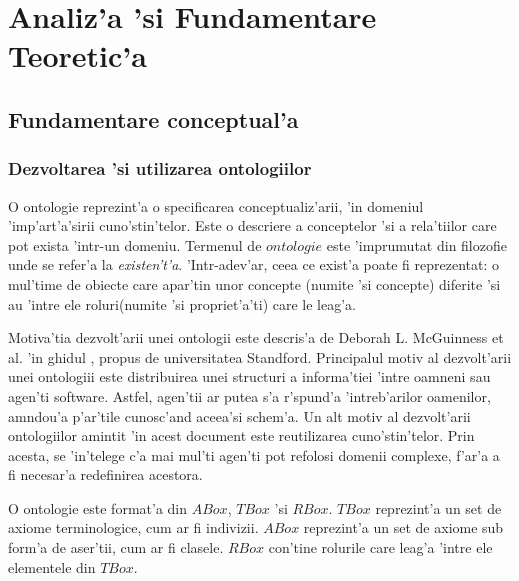 \documentclass[12pt,a4paper,twoside]{report}
\begin{document}
\chapter{Analiz'a 'si Fundamentare Teoretic'a}
\label{ch:analysis}

\section{Fundamentare conceptual'a}
\subsection{Dezvoltarea 'si utilizarea ontologiilor}


O ontologie reprezint'a o specificarea  conceptualiz'arii, 'in domeniul 'imp'art'a'sirii cuno'stin'telor. Este o descriere a conceptelor 'si a rela'tiilor care pot exista 'intr-un domeniu. Termenul de $ontologie$ este 'imprumutat din filozofie unde se refer'a la {\it existen't'a}. 'Intr-adev'ar, ceea ce exist'a poate fi reprezentat: o mul'time de obiecte care apar'tin unor concepte (numite 'si concepte) diferite 'si au 'intre ele roluri(numite 'si propriet'a'ti) care le leag'a.

Motiva'tia dezvolt'arii unei ontologii este descris'a de Deborah L. McGuinness et al. 'in ghidul \cite{protege_ontology}, propus de universitatea Standford. Principalul motiv al dezvolt'arii unei ontologiii este distribuirea unei structuri a informa'tiei 'intre oamneni sau agen'ti software. Astfel, agen'tii ar putea s'a r'spund'a 'intreb'arilor oamenilor, am\ia ndou'a p'ar'tile cunosc'and aceea'si schem'a. Un alt motiv al dezvolt'arii ontologiilor amintit 'in acest document este reutilizarea cuno'stin'telor. Prin acesta, se 'in'telege c'a mai mul'ti agen'ti pot refolosi domenii complexe, f'ar'a a fi necesar'a redefinirea acestora. 

O ontologie este format'a din $ABox$, $TBox$  'si $RBox$. $TBox$ reprezint'a un set de axiome terminologice, cum ar fi indivizii. $ABox$ reprezint'a un set de axiome sub form'a de aser'tii, cum ar fi clasele. $RBox$ con'tine rolurile care leag'a 'intre ele elementele din $TBox$. 

\end{document}
